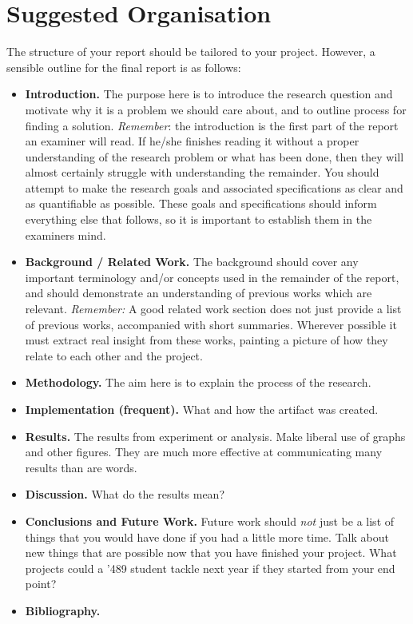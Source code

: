 \section{Suggested Organisation}
The structure of your report should be tailored to your project. However, a
sensible outline for the final report is as follows:
\begin{itemize}
\item {\bf Introduction.}  The purpose here is to introduce the
  research question and motivate why it is a problem we should
  care about, and to outline process for finding a solution.  {\em Remember}: the introduction is the first part of the
  report an examiner will read. If he/she finishes reading it without
  a proper understanding of the research problem or what has been
  done, then they will almost certainly struggle with understanding
  the remainder. You should attempt to make the research goals and associated
  specifications as clear and as quantifiable as possible. These goals and
  specifications should inform everything else that follows, so it is important
  to establish them in the examiners mind.

\item {\bf Background / Related Work.}  The background should cover
  any important terminology and/or concepts used in the remainder of
  the report, and should demonstrate an understanding of previous
  works which are relevant.  {\em Remember:} A good related work
  section does not just provide a list of previous works, accompanied
  with short summaries.  Wherever possible it must extract real
  insight from these works, painting a picture of how they relate to
  each other and the project.

\item {\bf Methodology.} The aim here is to explain the process of the research. 

\item {\bf Implementation (frequent).} What and how the artifact was created. 

\item {\bf Results.}
  The results from experiment or analysis.
  Make liberal use of graphs and other figures. They are much more effective at
  communicating many results than are words.

\item {\bf Discussion.}
  What do the results mean?

\item {\bf Conclusions and Future Work.}
  Future work should \emph{not} just be a list of things that you would have
  done if you had a little more time. Talk about new things that are possible
  now that you have finished your project. What projects could a '489 student
  tackle next year if they started from your end point?

\item {\bf Bibliography.}
\end{itemize}


